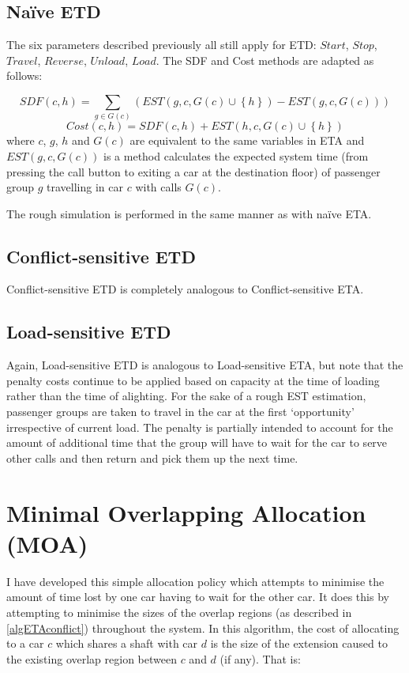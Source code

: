 \documentclass{UoYCSproject}
\begin{document}
\subsection{Na\"{i}ve ETD}

The six parameters described previously all still apply for ETD: $Start$, $Stop$, $Travel$, $Reverse$, $Unload$, $Load$.  The SDF and Cost methods are adapted as follows:

\[ SDF(c, h) = \sum\limits_{g \in G(c)} (EST(g, c, G(c) \cup \left\{ h \right\}) - EST(g, c, G(c)))\]
\[ Cost(c, h) = SDF(c, h) + EST(h, c, G(c) \cup \left\{ h \right\}) \]
where $c$, $g$, $h$ and $G(c)$ are equivalent to the same variables in ETA and $EST(g,c,G(c))$ is a method calculates the expected system time (from pressing the call button to exiting a car at the destination floor) of passenger group $g$ travelling in car $c$ with calls $G(c)$.

The rough simulation is performed in the same manner as with na\"{i}ve ETA.

\subsection{Conflict-sensitive ETD}

Conflict-sensitive ETD is completely analogous to Conflict-sensitive ETA.

\subsection{Load-sensitive ETD}

Again, Load-sensitive ETD is analogous to Load-sensitive ETA, but note that the penalty costs continue to be applied based on capacity at the time of loading rather than the time of alighting.  For the sake of a rough EST estimation, passenger groups are taken to travel in the car at the first `opportunity' irrespective of current load.  The penalty is partially intended to account for the amount of additional time that the group will have to wait for the car to serve other calls and then return and pick them up the next time.

\section{Minimal Overlapping Allocation (MOA)}

I have developed this simple allocation policy which attempts to minimise the amount of time lost by one car having to wait for the other car.  It does this by attempting to minimise the sizes of the overlap regions (as described in \autoref{algETAconflict}) throughout the system.  In this algorithm, the cost of allocating to a car $c$ which shares a shaft with car $d$ is the size of the extension caused to the existing overlap region between $c$ and $d$ (if any).  That is:
\end{document}
